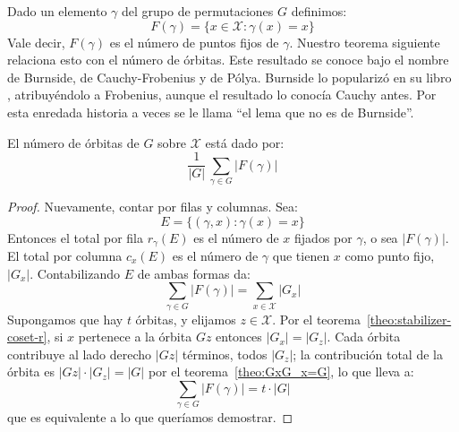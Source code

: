   Dado un elemento \(\gamma\) del grupo de permutaciones \(G\)
  definimos:
  \begin{equation*}
    F(\gamma) = \{x \in \mathcal{X} \colon \gamma(x) = x\}
  \end{equation*}
  Vale decir,
  \(F(\gamma)\) es el número de puntos fijos de \(\gamma\).
  Nuestro teorema siguiente relaciona esto con el número de órbitas.
  Este resultado se conoce bajo el nombre de Burnside,
  de Cauchy-Frobenius y de Pólya.
  Burnside lo popularizó en su libro~%
    \cite{burnside97:_theor_group_finit_order},
  atribuyéndolo a Frobenius,
  aunque el resultado lo conocía Cauchy antes.
  Por esta enredada historia
  a veces se le llama ``el lema que no es de Burnside''.
  \begin{theorem}
    \label{theo:Burnside}
    El número de órbitas de \(G\)
    sobre \(\mathcal{X}\) está dado por:
    \begin{equation*}
      \frac{1}{\lvert G \rvert} \,
	\sum_{\gamma \in G} \lvert F(\gamma) \rvert
    \end{equation*}
  \end{theorem}
  \begin{proof}
    Nuevamente,
    contar por filas y columnas.
    Sea:
    \begin{equation*}
      E = \{(\gamma, x) \colon \gamma(x) = x\}
    \end{equation*}
    Entonces el total por fila \(r_\gamma(E)\)
    es el número de \(x\) fijados por \(\gamma\),
    o sea \(\lvert F(\gamma) \rvert\).
    El total por columna \(c_x(E)\)
    es el número de \(\gamma\) que tienen \(x\) como punto fijo,
    \(\lvert G_x \rvert\).
    Contabilizando \(E\) de ambas formas da:
    \begin{equation*}
      \sum_{\gamma \in G} \lvert F(\gamma) \rvert
	= \sum_{x \in \mathcal{X}} \lvert G_x \rvert
    \end{equation*}
    Supongamos que hay \(t\) órbitas,
    y elijamos \(z \in \mathcal{X}\).
    Por el teorema~\ref{theo:stabilizer-coset-r},
    si \(x\) pertenece a la órbita \(G z\)
    entonces \(\lvert G_x \rvert = \lvert G_z \rvert\).
    Cada órbita contribuye
    al lado derecho \(\lvert G z \rvert\) términos,
    todos \(\lvert G_z \rvert\);
    la contribución total de la órbita
    es \(\lvert G z \rvert \cdot \lvert G_z \rvert
	   = \lvert G \rvert\)
    por el teorema~\ref{theo:GxG_x=G},
    lo que lleva a:
    \begin{equation*}
      \sum_{\gamma \in G} \lvert F(\gamma) \rvert
	= t \cdot \lvert G \rvert
    \end{equation*}
    que es equivalente a lo que queríamos demostrar.
  \end{proof}

